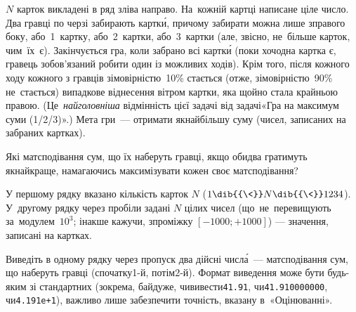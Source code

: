 
$N$ карток викладені в ряд зліва направо. На~кожній картці написане ціле число. Два гравці по черзі забирають картк\'{и}, причому забирати можна лише з\nolinebreak[3] правого боку, або~1~картку, або~2~картки, або~3~картки (але, звісно, не~більше карток, чим~їх~є). Закінчується гра, коли забрано всі картк\'{и} (поки хоч\nolinebreak[3] одна картка є, гравець зобов'язаний робити один із можливих ходів). 
Крім того, після кожного ходу кожного з гравців з\nolinebreak[3] імовірністю~10\% стається (отже, з\nolinebreak[3] імовірністю~90\% не~стається) випадкове віднесення вітром картки, яка щойно стала крайньою правою.
(Це~\emph{найголовніша} відмінність цієї задачі від задачі\nolinebreak[3] %
«Гра на максимум суми (1/2/3)».)
Мета гри~--- отримати 
якнайбільшу 
суму (чисел, записаних на забраних картках).

Які матсподівання сум, що їх наберуть гравці, якщо обидва гратимуть якнайкраще, 
намагаючись
максимізувати кожен своє матсподівання?


\InputFile
У першому рядку вказано кількість карток $N$ ($1\dib{{\<}}N\dib{{\<}}1234$). У~другому рядку через пробіли задані $N$ цілих чисел (що~не~перевищують за~модулем~$10^3$; інакше кажучи, з\nolinebreak[2] проміжку $[-1000; +1000]$) --- значення, записані на картках.


\OutputFile
Виведіть в одному рядку через пропуск два дійсні числ\'{а}~--- 
матсподівання сум, що наберуть гравці (спочатку\nolinebreak[3] \mbox{1-й}, потім\nolinebreak[3] \mbox{2-й}).
Формат виведення може бути будь-яким зі стандартних (зокрема, байдуже, чи\nolinebreak[3] вивести\nolinebreak[3] \texttt{41.91}, чи\nolinebreak[3] \texttt{41.910000000}, чи\nolinebreak[3] \mbox{\texttt{4.191e+1}}), важливо лише забезпечити точність, вказану в~«Оцінюванні».

\Examples

\noindent
\hspace*{-1.25em}\begin{exampleSimple}{15.125em}{7.875em}
%
%
%
\end{exampleSimple}

